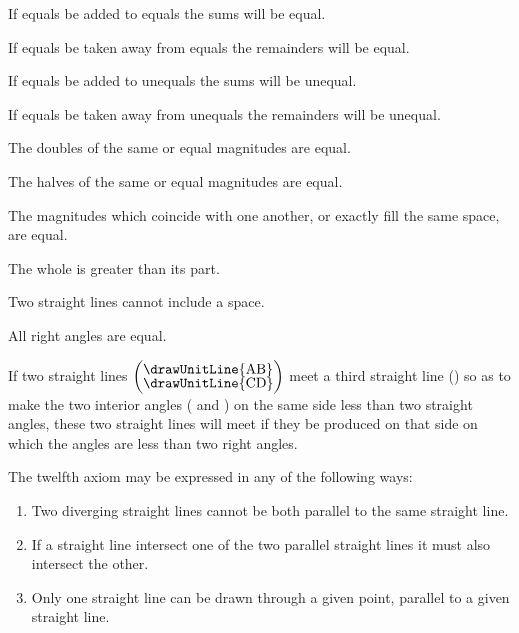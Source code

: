 \documentclass[booklanguage=english]{byrnebook}
\begin{document}
\startaxiom{}\label{ax:I.II}
If equals be added to equals the sums will be equal.

\startaxiom{}\label{ax:I.III}
If equals be taken away from equals the remainders will be equal.

\startaxiom{}\label{ax:I.IV}
If equals be added to unequals the sums will be unequal.

\startaxiom{}\label{ax:I.V}
If equals be taken away from unequals the remainders will be unequal.

\startaxiom{}\label{ax:I.VI}
The doubles of the same or equal magnitudes are equal.

\startaxiom{}\label{ax:I.VII}
The halves of the same or equal magnitudes are equal.

\startaxiom{}\label{ax:I.VIII}
The magnitudes which coincide with one another, or exactly fill the same space, are equal.

\startaxiom{}\label{ax:I.IX}
The whole is greater than its part.

\startaxiom{}\label{ax:I.X}
Two straight lines cannot include a space.

\startaxiom{}\label{ax:I.XI}
All right angles are equal.

\startaxiom{}\label{ax:I.XII}
\drawCurrentPictureInMargin[inside]
If two straight lines $\left(\vcenter{\nointerlineskip\hbox{\drawUnitLine{AB}}\nointerlineskip\hbox{\drawUnitLine{CD}}}\right)$ meet a third straight line () so as to make the two interior angles ( and ) on the same side less than two straight angles, these two straight lines will meet if they be produced on that side on which the angles are less than two right angles.

The twelfth axiom may be expressed in any of the following ways:
\begin{enumerate}
\item Two diverging straight lines cannot be both parallel to the same straight line.
\item If a straight line intersect one of the two parallel straight lines it must also intersect the other.
\item Only one straight line can be drawn through a given point, parallel to a given straight line.
\end{enumerate}
\end{document}
